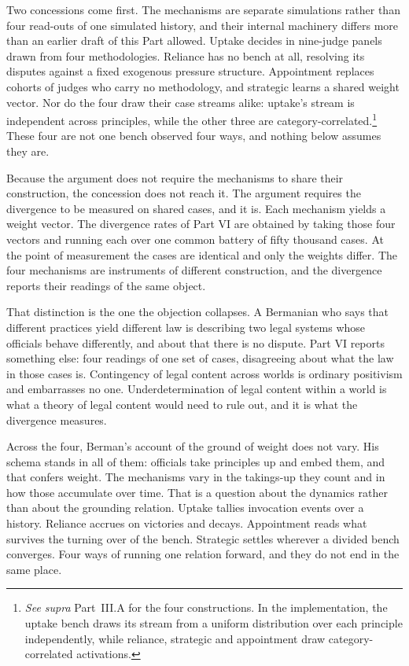 Two concessions come first. The mechanisms are separate simulations rather
than four read-outs of one simulated history, and their internal machinery
differs more than an earlier draft of this Part allowed. Uptake decides in
nine-judge panels drawn from four methodologies. Reliance has no bench at
all, resolving its disputes against a fixed exogenous pressure structure.
Appointment replaces cohorts of judges who carry no methodology, and
strategic learns a shared weight vector. Nor do the four draw their case
streams alike: uptake's stream is independent across principles, while the
other three are category-correlated.\footnote{\textit{See supra} Part~III.A
for the four constructions. In the implementation, the uptake bench draws
its stream from a uniform distribution over each principle independently,
while reliance, strategic and appointment draw category-correlated
activations.} These four are not one bench observed four ways, and nothing
below assumes they are.

Because the argument does not require the mechanisms to share their
construction, the concession does not reach it. The argument requires the
divergence to be measured on shared cases, and it is. Each mechanism yields
a weight vector. The divergence rates of Part VI are obtained by taking
those four vectors and running each over one common battery of fifty
thousand cases. At the point of measurement the cases are identical and
only the weights differ. The four mechanisms are instruments of different
construction, and the divergence reports their readings of the same object.

That distinction is the one the objection collapses. A Bermanian who says that
different practices yield different law is describing two legal systems whose
officials behave differently, and about that there is no dispute. Part VI
reports something else: four readings of one set of cases, disagreeing about
what the law in those cases is. Contingency of legal content across worlds is
ordinary positivism and embarrasses no one. Underdetermination of legal
content within a world is what a theory of legal content would need to rule
out, and it is what the divergence measures.

Across the four, Berman's account of the ground of weight does not vary.
His schema stands in all of them: officials take principles up and
embed them, and that confers weight. The mechanisms vary in the takings-up
they count and in how those accumulate over time. That is a question about the
dynamics rather than about the grounding relation.
Uptake tallies invocation events over a history. Reliance accrues on
victories and decays. Appointment reads what survives the turning over of
the bench. Strategic settles wherever a divided bench converges. Four ways
of running one relation forward, and they do not end in the same place.

